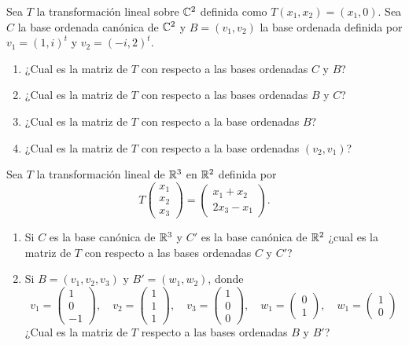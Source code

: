 \begin{exerciselist}
  \item Sea $T$ la transformación lineal sobre $\mathbb{C}^2$ definida como $T(x_1, x_2) = (x_1, 0)$. Sea $C$ la base ordenada canónica de $\mathbb{C}^2$ y $B = (v_1, v_2)$ la base ordenada definida por $v_1 = (1, i)^t$ y $v_2 = (-i, 2)^t$.
    \begin{enumerate}
      \item ¿Cual es la matriz de $T$ con respecto a las bases ordenadas $C$ y $B$?
      \item ¿Cual es la matriz de $T$ con respecto a las bases ordenadas $B$ y $C$?
      \item ¿Cual es la matriz de $T$ con respecto a la base ordenadas $B$?
      \item ¿Cual es la matriz de $T$ con respecto a la base ordenadas $(v_2, v_1)$?
    \end{enumerate}

  \item Sea $T$ la transformación lineal de $\mathbb{R}^3$ en $\mathbb{R}^2$ definida por 
    \[ T\begin{pmatrix} x_1 \\ x_2 \\ x_3 \end{pmatrix} = \begin{pmatrix} x_1 + x_2 \\ 2x_3 - x_1 \end{pmatrix}. \]
    \begin{enumerate}
      \item Si $C$ es la base canónica de $\mathbb{R}^3$ y $C'$ es la base canónica de $\mathbb{R}^2$ ¿cual es la matriz de $T$ con respecto a las bases ordenadas $C$ y $C'$?
      \item Si $B = (v_1, v_2, v_3)$ y $B' = (w_1, w_2)$, donde
        \[
          v_1 = \begin{pmatrix} 1 \\ 0 \\ -1 \end{pmatrix}, \quad
          v_2 = \begin{pmatrix} 1 \\ 1 \\ 1 \end{pmatrix}, \quad
          v_3 = \begin{pmatrix} 1 \\ 0 \\ 0 \end{pmatrix}, \quad
          w_1 = \begin{pmatrix} 0 \\ 1 \end{pmatrix}, \quad
          w_1 = \begin{pmatrix} 1 \\ 0 \end{pmatrix}
        \]
        ¿Cual es la matriz de $T$ respecto a las bases ordenadas $B$ y $B'$?
    \end{enumerate}


\end{exerciselist}
